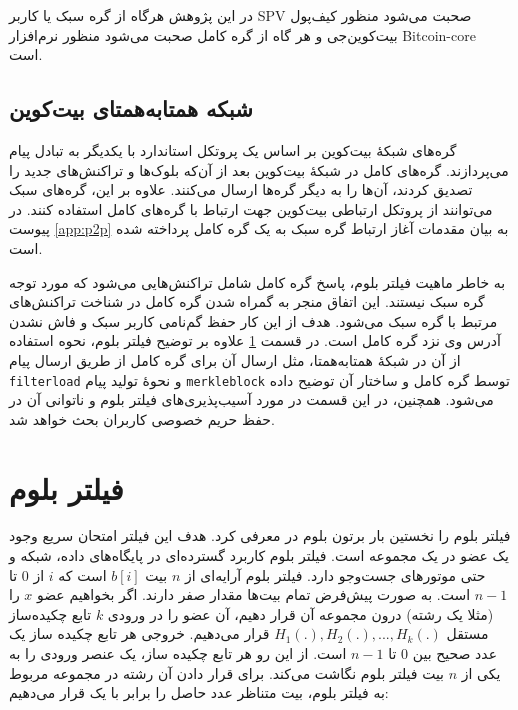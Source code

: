 در این پژوهش هرگاه از گره سبک یا کاربر SPV صحبت می‌شود منظور کیف‌پول بیت‌کوین‌جی \cite{bitcoinj} و هر گاه از گره کامل صحبت می‌شود منظور نرم‌افزار
\gls{Bitcoin-core}
\cite{Bitcoincore.org}
است.


\subsection{شبکه همتا‌به‌همتای بیت‌کوین}
\label{P2PNetwork}

گره‌های شبکهٔ بیت‌کوین بر اساس یک پروتکل استاندارد \cite{P2P_dev, P2P_ref} با یکدیگر به تبادل پیام می‌پردازند. گره‌های کامل در شبکهٔ بیت‌کوین بعد از آن‌که بلوک‌ها و تراکنش‌های جدید را تصدیق کردند، آن‌ها را به دیگر گره‌ها ارسال می‌کنند. علاوه بر این، گره‌های سبک می‌توانند از پروتکل ارتباطی بیت‌کوین جهت ارتباط با گره‌های کامل استفاده کنند. در پیوست \ref{app:p2p} به بیان مقدمات آغاز ارتباط گره سبک به یک گره کامل پرداخته شده است. 

به خاطر ماهیت فیلتر بلوم، پاسخ گره کامل  شامل تراکنش‌هایی می‌شود که مورد توجه گره سبک نیستند. این اتفاق منجر به گمراه شدن گره کامل در شناخت تراکنش‌های مرتبط با گره سبک می‌شود. هدف از این کار حفظ گم‌نامی کاربر سبک و فاش نشدن آدرس وی نزد گره کامل است. در قسمت \ref{BloomFilter} علاوه بر توضیح فیلتر بلوم، نحوه استفاده از آن در شبکهٔ همتابه‌همتا، مثل ارسال آن برای گره کامل  از طریق ارسال پیام \texttt{filterload} و نحوهٔ تولید پیام \texttt{merkleblock}  توسط گره کامل و ساختار آن توضیح داده می‌شود. همچنین، در این قسمت در مورد آسیب‌پذیری‌های فیلتر بلوم و ناتوانی آن در حفظ حریم خصوصی کاربران بحث خواهد شد.


\section{فیلتر بلوم}
\label{BloomFilter}
فیلتر بلوم را نخستین بار برتون بلوم در \cite{Bloom1970} معرفی کرد. هدف این فیلتر امتحان سریع وجود یک عضو در یک مجموعه است. فیلتر بلوم کاربرد گسترده‌ای در پایگاه‌های داده، شبکه و حتی موتور‌های جست‌وجو دارد. فیلتر بلوم آرایه‌ای از $n$ بیت $b[i]$ است که $i$ از $0$ تا$n-1$ است. به صورت پیش‌فرض تمام بیت‌ها مقدار صفر دارند. اگر بخواهیم عضو $x$ را (مثلا یک رشته) درون مجموعه آن قرار دهیم، آن عضو را در ورودی $k$ تابع چکیده‌ساز مستقل
$H_1(.), H_2(.), ..., H_k(.)$
قرار می‌دهیم. خروجی هر تابع چکیده ساز یک عدد صحیح بین $0$ تا $n-1$ است. از این رو هر تابع چکیده ساز، یک عنصر ورودی را به یکی از	 $n$ بیت فیلتر بلوم نگاشت می‌کند. برای قرار دادن آن رشته در مجموعه مربوط به فیلتر بلوم، بیت متناظر عدد حاصل را برابر با یک قرار می‌دهیم: 

